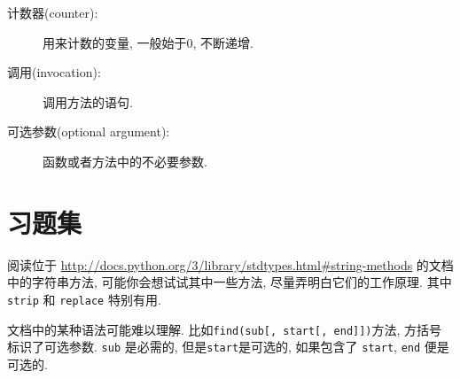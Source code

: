 \documentclass[10pt]{book}
\begin{document}
\begin{description}
\item[计数器(counter):] 用来计数的变量, 一般始于0, 不断递增. 

\item[调用(invocation):] 调用方法的语句.

\item[可选参数(optional argument):] 函数或者方法中的不必要参数. 

\end{description}


\section{习题集}

\begin{exercise}

阅读位于 \url{http://docs.python.org/3/library/stdtypes.html#string-methods}
的文档中的字符串方法, 
可能你会想试试其中一些方法, 尽量弄明白它们的工作原理. 
其中{\tt strip} 和 {\tt replace} 特别有用. 

文档中的某种语法可能难以理解. 
比如\verb"find(sub[, start[, end]])"方法, 方括号标识了可选参数. 
 {\tt sub} 是必需的, 但是{\tt start}是可选的, 
如果包含了 {\tt start}, {\tt end} 便是可选的. 

\end{exercise}
\end{document}
